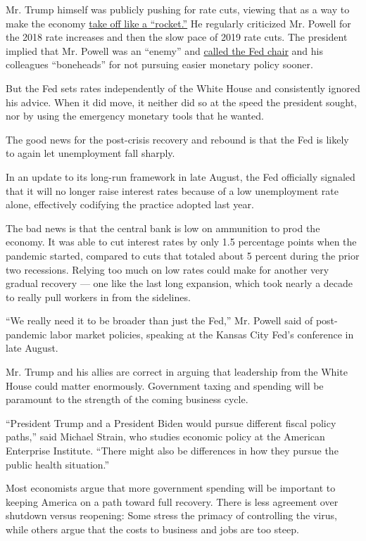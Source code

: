 Mr. Trump himself was publicly pushing for rate cuts, viewing that as a
way to make the economy
\href{https://www.cnbc.com/2019/07/05/trump-if-we-had-a-fed-that-would-lower-interest-rates-wed-be-like-a-rocket-ship.html}{take
off like a ``rocket.''} He regularly criticized Mr. Powell for the 2018
rate increases and then the slow pace of 2019 rate cuts. The president
implied that Mr. Powell was an ``enemy'' and
\href{https://www.nytimes3xbfgragh.onion/2019/09/11/business/economy/bonehead-trump-jay-powell.html}{called
the Fed chair} and his colleagues ``boneheads'' for not pursuing easier
monetary policy sooner.

But the Fed sets rates independently of the White House and consistently
ignored his advice. When it did move, it neither did so at the speed the
president sought, nor by using the emergency monetary tools that he
wanted.

The good news for the post-crisis recovery and rebound is that the Fed
is likely to again let unemployment fall sharply.

In an update to its long-run framework in late August, the Fed
officially signaled that it will no longer raise interest rates because
of a low unemployment rate alone, effectively codifying the practice
adopted last year.

The bad news is that the central bank is low on ammunition to prod the
economy. It was able to cut interest rates by only 1.5 percentage points
when the pandemic started, compared to cuts that totaled about 5 percent
during the prior two recessions. Relying too much on low rates could
make for another very gradual recovery --- one like the last long
expansion, which took nearly a decade to really pull workers in from the
sidelines.

``We really need it to be broader than just the Fed,'' Mr. Powell said
of post-pandemic labor market policies, speaking at the Kansas City
Fed's conference in late August.

Mr. Trump and his allies are correct in arguing that leadership from the
White House could matter enormously. Government taxing and spending will
be paramount to the strength of the coming business cycle.

``President Trump and a President Biden would pursue different fiscal
policy paths,'' said Michael Strain, who studies economic policy at the
American Enterprise Institute. ``There might also be differences in how
they pursue the public health situation.''

Most economists argue that more government spending will be important to
keeping America on a path toward full recovery. There is less agreement
over shutdown versus reopening: Some stress the primacy of controlling
the virus, while others argue that the costs to business and jobs are
too steep.

